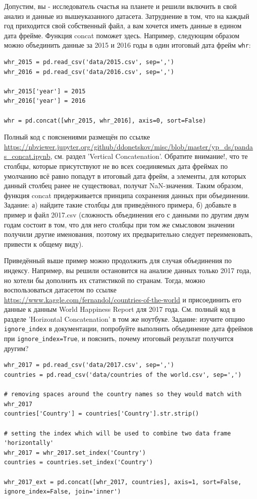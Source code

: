 \documentclass[a4paper,12pt]{article}
\begin{document}
Допустим, вы - исследователь счастья на планете и решили включить в свой анализ и данные из вышеуказанного датасета. Затруднение в том, что на каждый год приходится свой собственный файл, а вам хочется иметь данные в едином дата фрейме. Функция concat поможет здесь. Например, следующим образом можно объединить данные за 2015 и 2016 годы в один итоговый дата фрейм \texttt{whr}:

\begin{lstlisting}[style=python]
whr_2015 = pd.read_csv('data/2015.csv', sep=',')
whr_2016 = pd.read_csv('data/2016.csv', sep=',')

whr_2015['year'] = 2015
whr_2016['year'] = 2016

whr = pd.concat([whr_2015, whr_2016], axis=0, sort=False)
\end{lstlisting}

Полный код с пояснениями размещён по ссылке \url{https://nbviewer.jupyter.org/github/ddonetskov/misc/blob/master/yp_ds/pandas_concat.ipynb}, см. раздел 'Vertical Concatenation'. Обратите внимание!, что те столбцы, которые присутствуют не во всех соединяемых дата фреймах по умолчанию всё равно попадут в итоговый дата фрейм, а элементы, для которых данный столбец ранее не существовал, получат NaN-значения. Таким образом, функция concat придерживается принципа сохранения данных при объединении. {\color{blue} \faCog } Задание: а) найдите такие столбцы для приведённого примера, б) добавьте в пример и файл 2017.csv (сложность объединения его с данными по другим двум годам состоит в том, что для него столбцы при том же смысловом значении получили другие именования, поэтому их предварительно следует переименовать, привести к общему виду).

Приведённый выше пример можно продолжить для случая объединения по индексу. Например, вы решили остановится на анализе данных только 2017 года, но хотели бы дополнить их статистикой по странам. Тогда, можно воспользоваться датасетом по ссылке \url{https://www.kaggle.com/fernandol/countries-of-the-world} и присоединить его данные к данным World Happiness Report для 2017 года. См. полный код в разделе 'Horizontal Concatenation' в том же ноутбуке. {\color{blue} \faCog } Задание: изучите опцию \texttt{ignore\_index} в документации, попробуйте выполнить объединение дата фреймов при \texttt{ignore\_index=True}, и пояснить, почему итоговый результат получится другим?

\begin{lstlisting}[style=python]
whr_2017 = pd.read_csv('data/2017.csv', sep=',')
countries = pd.read_csv('data/countries of the world.csv', sep=',')

# removing spaces around the country names so they would match with whr_2017
countries['Country'] = countries['Country'].str.strip()

# setting the index which will be used to combine two data frame 'horizontally'
whr_2017 = whr_2017.set_index('Country')
countries = countries.set_index('Country')

whr_2017_ext = pd.concat([whr_2017, countries], axis=1, sort=False, ignore_index=False, join='inner')
\end{lstlisting}
\end{document}
